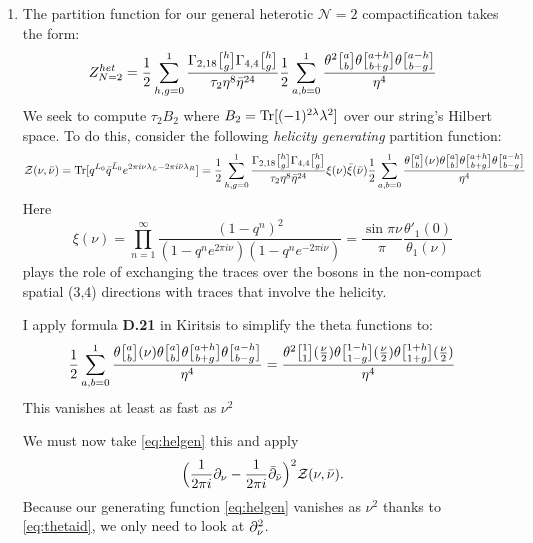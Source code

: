 \documentclass[11pt, class=article, crop=false]{standalone}
\begin{document}
\begin{enumerate}
	Under $\tau \to -1/\tau$ the twisted sector's projected part picks up a factor of $-1$, exactly what we need to cancel the $-1$ on the left-moving side.
	
	\item The partition function for our general heterotic $\mathcal N=2$ compactification takes the form:
	\[
		Z_{N=2}^{het} = \frac12 \sum_{h,g=0}^1 \frac{\Gamma_{2,18} \twist hg \Gamma_{4,4} \twist hg}{\tau_2 \eta^{8} \bar \eta^{24}} \frac12 \sum_{a,b=0}^1 \frac{\theta^2 \twist ab \theta\twist{a+h}{b+g} \theta\twist{a-h}{b-g}}{ \eta^4}
	\]
	 We seek to compute $\tau_2 B_2$ where $B_2 = \mathrm{Tr}[(-1)^{2\lambda} \lambda^2]$ over our string's Hilbert space. To do this, consider the following \emph{helicity generating} partition function:
	\begin{equation} \label{eq:helgen}
			\mathcal Z(\nu, \bar \nu) = \Tr[q^{L_0} \bar q^{\bar L_0} e^{2\pi i \nu \lambda_L - 2\pi i \bar \nu \lambda_R}] =  \frac12 \sum_{h,g=0}^1 \frac{\Gamma_{2,18} \twist hg \Gamma_{4,4} \twist hg}{\tau_2 \eta^{8} \bar \eta^{24}} \xi(\nu) \bar \xi(\bar \nu) \frac12 \sum_{a,b=0}^1 \frac{\theta\twist ab(\nu) \theta \twist ab \theta\twist{a+h}{b+g} \theta\twist{a-h}{b-g}}{ \eta^4}
	\end{equation}
	Here
	\[
		\xi(\nu) = \prod_{n=1}^\infty \frac{(1-q^n)^2}{(1-q^n e^{2\pi i \nu}) (1-q^n e^{-2\pi i \nu})} = \frac{\sin \pi \nu}{\pi} \frac{\theta'_1(0)}{\theta_1(\nu)}
	\]
	plays the role of exchanging the traces over the bosons in the non-compact spatial (3,4) directions with traces that involve the helicity. 
	
	I apply formula \textbf{D.21} in Kiritsis to simplify the theta functions to:
	\begin{equation}\label{eq:thetaid}
		\frac12 \sum_{a,b=0}^1 \frac{\theta\twist ab(\nu) \theta \twist ab \theta\twist{a+h}{b+g} \theta\twist{a-h}{b-g}}{ \eta^4} = \frac{\theta^2 \twist11 (\frac \nu2) \theta \twist{1-h}{1-g} (\frac \nu2) \theta \twist{1+h}{1+g} (\frac \nu2)}{\eta^4}
	\end{equation}
	This vanishes at least as fast as $\nu^2$
	
	We must now take \eqref{eq:helgen} this and apply
	\[
		\Big(\frac{1}{2\pi i} \partial_\nu - \frac{1}{2\pi i} \bar {\partial}_{\bar \nu}\Big)^2  \mathcal Z(\nu, \bar \nu).
	\]
	Because our generating function \eqref{eq:helgen} vanishes as $\nu^2$ thanks to \eqref{eq:thetaid}, we only need to look at $\partial_\nu^2$.
	

\end{enumerate}
\end{document}
